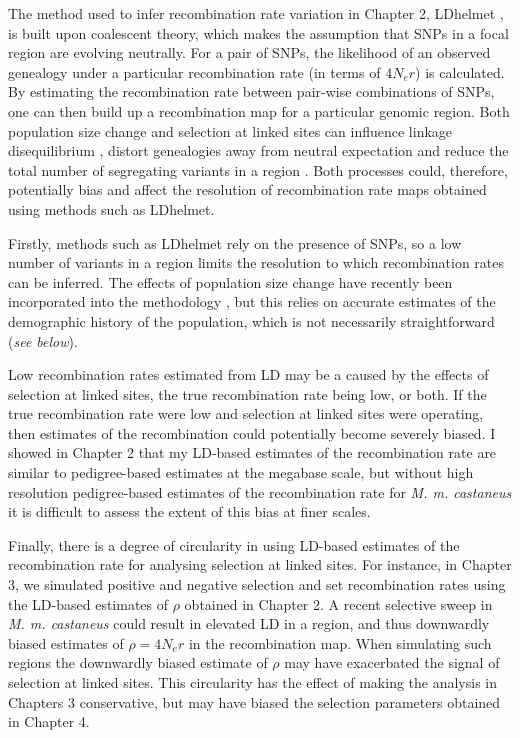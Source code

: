 	The method used to infer recombination rate variation in Chapter 2, LDhelmet \citep{RN213}, is built upon coalescent theory, which makes the assumption that SNPs in a focal region are evolving neutrally. For a pair of SNPs, the likelihood of an observed genealogy under a particular recombination rate (in terms of $4N_er$) is calculated. By estimating the recombination rate between pair-wise combinations of SNPs, one can then build up a recombination map for a particular genomic region. Both population size change and selection at linked sites can influence linkage disequilibrium \citep{RN319}, distort genealogies away from neutral expectation \citep{RN192} and reduce the total number of segregating variants in a region \citep{RN287}. Both processes could, therefore, potentially bias and affect the resolution of recombination rate maps obtained using methods such as LDhelmet.
		
	Firstly, methods such as LDhelmet rely on the presence of SNPs, so a low number of variants in a region limits the resolution to which recombination rates can be inferred. The effects of population size change have recently been incorporated into the methodology \citep{RN381}, but this relies on accurate estimates of the demographic history of the population, which is not necessarily straightforward (\textit{see below}).
	
	Low recombination rates estimated from LD may be a caused by the effects of selection at linked sites, the true recombination rate being low, or both. If the true recombination rate were low and selection at linked sites were operating, then estimates of the recombination could potentially become severely biased. I showed in Chapter 2 that my LD-based estimates of the recombination rate are similar to pedigree-based estimates at the megabase scale, but without high resolution pedigree-based estimates of the recombination rate for \textit{M. m. castaneus} it is difficult to assess the extent of this bias at finer scales. 
	
	Finally, there is a degree of circularity in using LD-based estimates of the recombination rate for analysing selection at linked sites. For instance, in Chapter 3, we simulated positive and negative selection and set recombination rates using the LD-based estimates of $\rho$ obtained in Chapter 2. A recent selective sweep in \textit{M. m. castaneus} could result in elevated LD in a region, and thus downwardly biased estimates of $\rho = 4N_er$ in the recombination map. When simulating such regions the downwardly biased estimate of $\rho$ may have exacerbated the signal of selection at linked sites. This circularity has the effect of making the analysis in Chapters 3 conservative, but may have biased the selection parameters obtained in Chapter 4.

